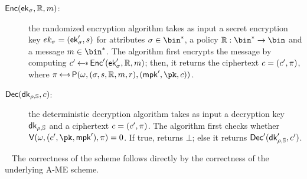 \begin{construction}
\begin{description}
        \item[$\mathsf{Enc}(\mathsf{ek}_\sigma, \mathbb{R}, m)$:] the randomized encryption algorithm takes as input a secret encryption key $ek_\sigma = (\mathsf{ek}'_\sigma, s)$ for attributes $\sattr \in \bin^*$, a policy $\raccess: \bin^* \to \bin$ and a message $\msg \in \bin^*$. The algorithm first encrypts the message by computing $\cipher' \getsr \enc'(\ek'_\sattr, \raccess, \msg)$; then, it returns the ciphertext $c = (c', \pi)$, where $\pi \getsr \prover(\crs, (\sattr, \signature, \raccess, \msg, r),(\mpk', \pk, \cipher))$.
        \item[$\mathsf{Dec}(\mathsf{dk}_{\rho, \mathbb{S}}, c)$:] the deterministic decryption algorithm takes as input a decryption key $\mathsf{dk}_{\rho, \mathbb{S}}$ and a ciphertext $c = (c', \pi)$. The algorithm first checks whether $\verifier(\crs, (\cipher', \pk, \mpk'), \pi) = 0$. If true, returns $\bot$; else it returns $\mathsf{Dec}'(\mathsf{dk}'_{\rho, \mathbb{S}}, c')$.
    \end{description}
\end{construction}
~\newline
The correctness of the scheme follows directly by the correctness of the underlying A-ME scheme.


